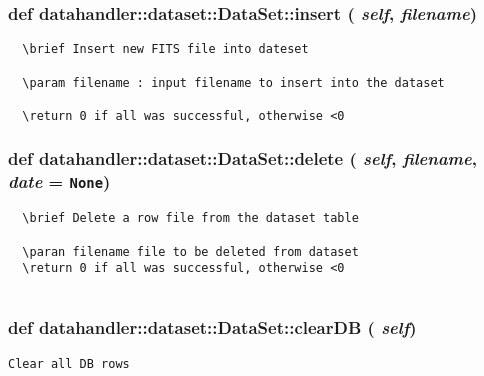 \subsubsection{\setlength{\rightskip}{0pt plus 5cm}def datahandler::dataset::Data\-Set::insert ( {\em self},  {\em filename})}\label{classdatahandler_1_1dataset_1_1DataSet_866961670af40a6469d4fb523c32460c}




\footnotesize\begin{verbatim}
  \brief Insert new FITS file into dateset

  \param filename : input filename to insert into the dataset

  \return 0 if all was successful, otherwise <0
\end{verbatim}
\normalsize
\subsubsection{\setlength{\rightskip}{0pt plus 5cm}def datahandler::dataset::Data\-Set::delete ( {\em self},  {\em filename},  {\em date} = {\tt None})}\label{classdatahandler_1_1dataset_1_1DataSet_f7be48095ac89c30b211921914c60d79}




\footnotesize\begin{verbatim}
  \brief Delete a row file from the dataset table

  \paran filename file to be deleted from dataset
  \return 0 if all was successful, otherwise <0
  
\end{verbatim}
\normalsize
\subsubsection{\setlength{\rightskip}{0pt plus 5cm}def datahandler::dataset::Data\-Set::clear\-DB ( {\em self})}\label{classdatahandler_1_1dataset_1_1DataSet_243b567a216ef6174edc67d3546523e3}




\footnotesize\begin{verbatim}Clear all DB rows\end{verbatim}
\normalsize
